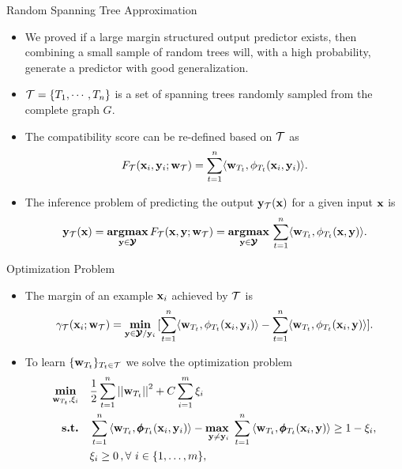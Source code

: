 \documentclass[first=dgreen,second=purple,logo=yellowexc]{aaltoslides}
\begin{document}
%
\begin{frame}{Random Spanning Tree Approximation}
	\begin{itemize}
		\item We proved if a large margin structured output predictor exists, then combining a small sample of random trees will, with a high probability, generate a predictor with good generalization.
		\item $\mathcal{T}=\{T_1,\cdots,T_n\}$ is a set of spanning trees randomly sampled from the complete graph $G$.
		\item The compatibility score can be re-defined based on $\mathcal{T}$ as
		\begin{align*}
			F_{\mathcal{T}}(\mathbf {x}_i,\mathbf {y}_i;\mathbf {w}_{\mathcal{T}}) = \sum_{t=1}^{n}\langle \mathbf {w}_{T_t}, \phi_{T_t}(\mathbf {x}_i,\mathbf {y}_i) \rangle.
		\end{align*}
		\item The inference problem of predicting the output $\mathbf {y}_{\mathcal{T}}(\mathbf {x})$ for a given input $\mathbf {x}$ is 
		\begin{align*}
			\mathbf {y}_{\mathcal{T}}(\mathbf {x}) = \underset{\mathbf {y}\in\pmb {\mathcal{Y}}}{\textbf{argmax}}\,F_{\mathcal{T}}(\mathbf {x},\mathbf {y};\mathbf {w}_{\mathcal{T}})=\underset{\mathbf {y}\in\pmb {\mathcal{Y}}}{\textbf{argmax}}\,\sum_{t=1}^{n}\langle \mathbf {w}_{T_t}, \phi_{T_t}(\mathbf {x},\mathbf {y}) \rangle.
		\end{align*}
	\end{itemize}
\end{frame}


%
\begin{frame}{Optimization Problem}
	\begin{itemize}
		\item The margin of an example $\mathbf {x}_i$ achieved by $\mathcal{T}$ is
		\begin{align*}
		\gamma_{\mathcal{T}}(\mathbf {x}_i;\mathbf {w}_{\mathcal{T}}) = \underset{\mathbf {y}\in\pmb {\mathcal{Y}}/\mathbf {y}_i}{\textbf{min}}\,[\sum_{t=1}^{n}\langle \mathbf {w}_{T_t}, \phi_{T_t}(\mathbf {x}_i,\mathbf {y}_i) \rangle-\sum_{t=1}^{n}\langle \mathbf {w}_{T_t}, \phi_{T_t}(\mathbf {x}_i,\mathbf {y}) \rangle].
	\end{align*}
		\item To learn $\{\mathbf {w}_{T_t}\}_{T_t\in\mathcal{T}}$ we solve the optimization problem
		\begin{align*}
			\underset{\vw_{T_t},\xi_i}{\minimize} & \quad \frac{1}{2}\sum_{t=1}^{n}\norm{\vw_{T_t}}^2 + C\sum_{i=1}^{m}\xi_i\\
			\st & \quad \sum_{t=1}^{n}{ \langle \vw_{T_t}, \phib_{T_t}(\vx_i,\vy_i) \rangle} - \underset{\vy \neq \vy_i}{\maximize\ } \sum_{t=1}^{n}{\langle \vw_{T_t}, \phib_{T_t}(\vx_i,\vy) \rangle } \geq 1 -  \xi_i, \\
			& \quad \xi_i\ge0\, , \forall\ i \in \set{1,\dots,m},
		\end{align*}
	\end{itemize}
\end{frame}
\end{document}
